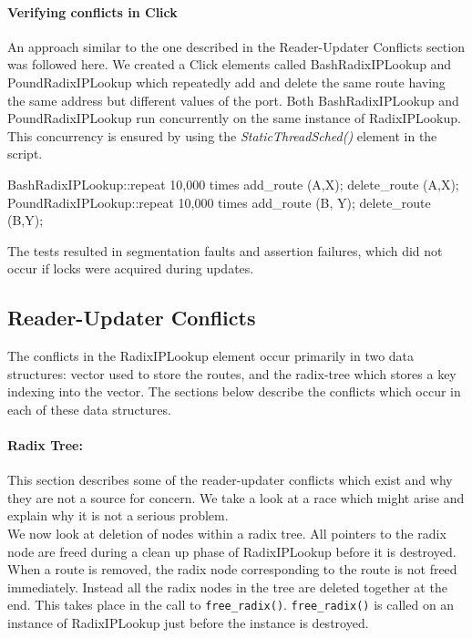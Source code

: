 \documentclass[12pt,a4paper]{article}
\begin{document}
\paragraph{Verifying conflicts in Click}
An approach similar to the one described in the Reader-Updater Conflicts section was followed here. We created a Click elements called BashRadixIPLookup and PoundRadixIPLookup which repeatedly add and delete the same route having the same address but different values of the port. Both BashRadixIPLookup and PoundRadixIPLookup run concurrently on the same instance of RadixIPLookup. This concurrency is ensured by using the \emph{StaticThreadSched()} element in the script.
\begin{code}
  BashRadixIPLookup::repeat 10,000 times {
    add_route (A,X);
    delete_route (A,X);
  }
  PoundRadixIPLookup::repeat 10,000 times {
    add_route (B, Y);
    delete_route (B,Y);
  } 
\end{code}
The tests resulted in segmentation faults and assertion failures, which did not occur if locks were acquired during updates.
\subsection{Reader-Updater Conflicts}
The conflicts in the RadixIPLookup element occur primarily in two data structures: vector used to store the routes, and the radix-tree which stores a key indexing into the vector. The sections below describe the conflicts which occur in each of these data structures.
\paragraph{Radix Tree:}
This section describes some of the reader-updater conflicts which exist and why they are not a source for concern. We take a look at a race which might arise and explain why it is not a serious problem.\\

We now look at deletion of nodes within a radix tree. All pointers to the radix node are freed during a clean up phase of RadixIPLookup before it is destroyed. When a route is removed, the radix node corresponding to the route is not freed immediately. Instead all the radix nodes in the tree are deleted together at the end. This takes place in the call to \verb+free_radix()+. \verb+free_radix()+ is called on an instance of RadixIPLookup just before the instance is destroyed.\\
\end{document}

